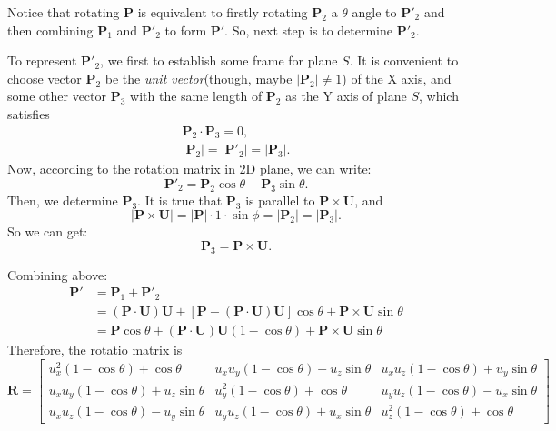 \documentclass{article}
\begin{document}
Notice that rotating \textbf{P} is equivalent to firstly rotating $\mathbf{P}_2$ a $\theta$ angle to $\mathbf{P}'_2$ and then combining $\mathbf{P}_1$ and $\mathbf{P}'_2$ to form $\mathbf{P}'$. So, next step is to determine $\mathbf{P}'_2$. 

To represent $\mathbf{P}'_2$, we first to establish some frame for plane $S$. It is convenient to choose vector $\mathbf{P}_2$ be the \textit{unit vector}(though, maybe $|\mathbf{P}_2| \ne 1$) of the X axis, and some other vector $\mathbf{P}_3$ with the same length of $\mathbf{P}_2$ as the Y axis of plane $S$, which satisfies
\begin{displaymath}
\begin{split}
\mathbf{P}_2 \cdot \mathbf{P}_3 = 0, \\
|\mathbf{P}_2| = |\mathbf{P}'_2| = |\mathbf{P}_3|.
\end{split}
\end{displaymath}
Now, according to the rotation matrix in 2D plane, we can write:
\begin{displaymath}
\mathbf{P}'_2 = \mathbf{P}_2\cos{\theta} + \mathbf{P}_3\sin{\theta}.
\end{displaymath}
Then, we determine $\mathbf{P}_3$. It is true that $\mathbf{P}_3$ is parallel to $\mathbf{P}\times\mathbf{U}$, and 
\begin{displaymath}
|\mathbf{P}\times\mathbf{U}| = |\mathbf{P}| \cdot 1 \cdot \sin{\phi} = |\mathbf{P}_2| = |\mathbf{P}_3|.
\end{displaymath}
So we can get:
\begin{displaymath}
\mathbf{P}_3 = \mathbf{P}\times\mathbf{U}.
\end{displaymath}

Combining above:
\begin{displaymath}
\begin{split}
\mathbf{P}' &= \mathbf{P}_1 + \mathbf{P}'_2 \\
 &= (\mathbf{P}\cdot\mathbf{U})\mathbf{U} + [\mathbf{P}-(\mathbf{P}\cdot\mathbf{U})\mathbf{U}]\cos{\theta}+\mathbf{P}\times\mathbf{U}\sin{\theta} \\
 &= \mathbf{P}\cos{\theta} + (\mathbf{P}\cdot\mathbf{U})\mathbf{U}(1-\cos{\theta})+\mathbf{P}\times\mathbf{U}\sin{\theta}
\end{split}
\end{displaymath}
Therefore, the rotatio matrix is
\begin{displaymath}
\mathbf{R} = \begin{bmatrix}
u_x^2(1-\cos{\theta})+\cos{\theta} & u_xu_y(1-\cos{\theta})-u_z\sin{\theta} & u_xu_z(1-\cos{\theta})+u_y\sin{\theta} \\
u_xu_y(1-\cos{\theta})+u_z\sin{\theta} & u_y^2(1-\cos{\theta})+\cos{\theta} & u_yu_z(1-\cos{\theta})-u_x\sin{\theta} \\
u_xu_z(1-\cos{\theta})-u_y\sin{\theta} &  u_yu_z(1-\cos{\theta})+u_x\sin{\theta} & u_z^2(1-\cos{\theta})+\cos{\theta}
\end{bmatrix}
\end{displaymath}
\end{document}
